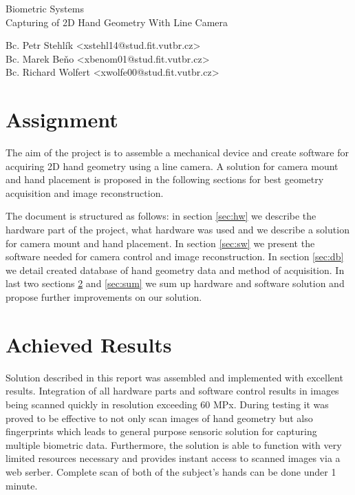 \documentclass[11pt,a4paper]{article}
\begin{document}
\begin{center}
	\LARGE{Biometric Systems}\\
	\Large{Capturing of 2D Hand Geometry With Line Camera}
	\vspace{0.5cm}

    \begin{centering}
    \small{
        Bc. Petr Stehlík <xstehl14@stud.fit.vutbr.cz>\\
        Bc. Marek Beňo <xbenom01@stud.fit.vutbr.cz>\\
        Bc. Richard Wolfert <xwolfe00@stud.fit.vutbr.cz>\\
        }
    \end{centering}

	\vspace{0.2cm}

\end{center}

\section{Assignment}
The aim of the project is to assemble a mechanical device and create software for acquiring 2D hand geometry using a line camera.
A solution for camera mount and hand placement is proposed in the following sections for best geometry acquisition and image reconstruction.

The document is structured as follows: in section \ref{sec:hw} we describe the hardware part of the project, what hardware was used
and we describe a solution for camera mount and hand placement. In section \ref{sec:sw} we present the software needed for camera control and image reconstruction.
In section \ref{sec:db} we detail created database of hand geometry data and method of acquisition. In last two sections \ref{sec:res}
and \ref{sec:sum} we sum up hardware and software solution and propose further improvements on our solution.








\section{Achieved Results}
\label{sec:res}
Solution described in this report was assembled and implemented with excellent results. Integration of all hardware parts and software control results
in images being scanned quickly in resolution exceeding 60 MPx. During testing it was proved to be effective to not only scan images
of hand geometry but also fingerprints which leads to general purpose sensoric solution for capturing multiple biometric data. Furthermore,
the solution is able to function with very limited resources necessary and provides instant access to scanned images via a web serber. Complete scan of both of the subject's
hands can be done under 1 minute.
\end{document}
